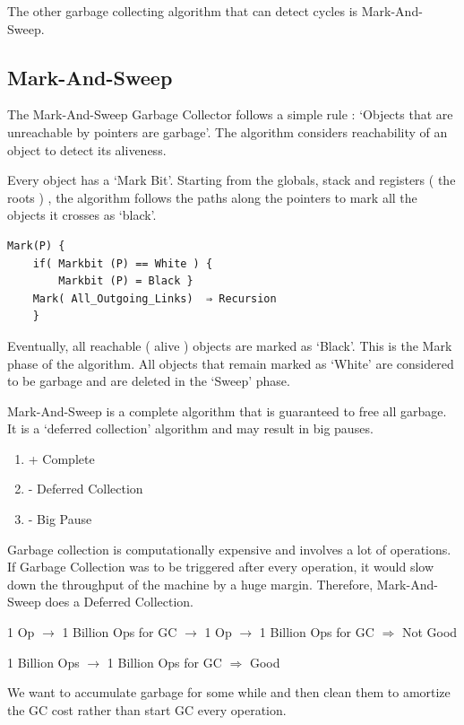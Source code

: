 \documentclass[twoside]{article}
\begin{document}
The other garbage collecting algorithm that can detect cycles is Mark-And-Sweep.

\subsection{Mark-And-Sweep}

The Mark-And-Sweep Garbage Collector follows a simple rule : ‘Objects that are unreachable by pointers are garbage’. The algorithm considers reachability of an object to detect its aliveness.

Every object has a ‘Mark Bit’. Starting from the globals, stack and registers ( the roots ) , the algorithm follows the paths along the pointers to mark all the objects it crosses as ‘black’.

\begin{lstlisting}
Mark(P) {
	if( Markbit (P) == White ) {
		Markbit (P) = Black }
	Mark( All_Outgoing_Links)  ⇒ Recursion
	}
\end{lstlisting}

Eventually, all reachable ( alive ) objects are marked as ‘Black’. This is the Mark phase of the algorithm.  All objects that remain marked as ‘White’ are considered to be garbage and are deleted in the ‘Sweep’ phase.

Mark-And-Sweep is a complete algorithm that is guaranteed to free all garbage. It is a ‘deferred collection’ algorithm and may result in big pauses.

\begin{enumerate}
\item + Complete
\item - Deferred Collection
\item - Big Pause
\end{enumerate}

Garbage collection is computationally expensive and involves a lot of operations. If Garbage Collection was to be triggered after every operation, it would slow down the throughput of the machine by a huge margin. Therefore, Mark-And-Sweep does a Deferred Collection. 

1 Op $\rightarrow$ 1 Billion Ops for GC $\rightarrow$ 1 Op $\rightarrow$ 1 Billion Ops for GC $\Rightarrow$ Not Good

1 Billion Ops $\rightarrow$ 1 Billion Ops for GC $\Rightarrow$ Good

We want to accumulate garbage for some while and then clean them to amortize the GC cost rather than start GC every operation.
\end{document}
